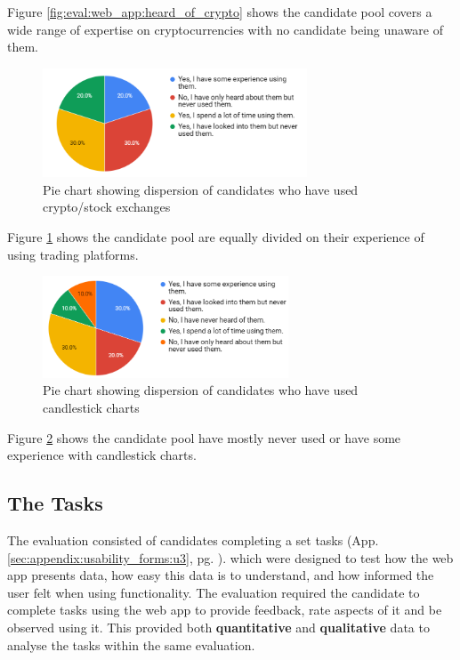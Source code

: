 \noindent Figure \ref{fig:eval:web_app:heard_of_crypto} shows the candidate pool covers a wide range of expertise on cryptocurrencies with no candidate being unaware of them.



  \begin{figure}[ht]
  \centering
 \includegraphics[width=0.7\textwidth]{content/graphics/exp_with_crypto.PNG}
  \caption{Pie chart showing dispersion of candidates who have used crypto/stock exchanges}
  \label{fig:eval:web_app:exp_with_crypto}
\end{figure}

\noindent Figure \ref{fig:eval:web_app:exp_with_crypto} shows the candidate pool are equally divided on their experience of using trading platforms.

  \begin{figure}[ht]
  \centering
 \includegraphics[width=0.65\textwidth]{content/graphics/exp_with_kline.PNG}
  \caption{Pie chart showing dispersion of candidates who have used candlestick charts}
  \label{fig:eval:web_app:exp_with_kline}
\end{figure}

\noindent Figure \ref{fig:eval:web_app:exp_with_kline} shows the candidate pool have mostly never used or have some experience with candlestick charts.

\subsection{The Tasks}
\label{sec:evaluation:ui:tasks}
\noindent The evaluation consisted of candidates completing a set tasks (App. \ref{sec:appendix:usability_forms:u3}, pg. \pageref{sec:appendix:usability_forms:u3}). which were designed to test how the web app presents data, how easy this data is to understand, and how informed the user felt when using functionality. The evaluation required the candidate to complete tasks using the web app to provide feedback, rate aspects of it and be observed using it. This provided both \textbf{quantitative} and \textbf{qualitative} data to analyse the tasks within the same evaluation.

